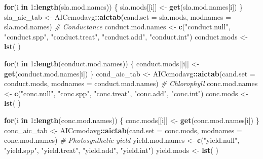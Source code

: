 \documentclass[]{scrartcl}
\newenvironment{Shaded}{\begin{snugshade}}{\end{snugshade}}
\newcommand{\CommentTok}[1]{\textcolor[rgb]{0.56,0.35,0.01}{\textit{#1}}}
\newcommand{\ControlFlowTok}[1]{\textcolor[rgb]{0.13,0.29,0.53}{\textbf{#1}}}
\newcommand{\DataTypeTok}[1]{\textcolor[rgb]{0.13,0.29,0.53}{#1}}
\newcommand{\DecValTok}[1]{\textcolor[rgb]{0.00,0.00,0.81}{#1}}
\newcommand{\KeywordTok}[1]{\textcolor[rgb]{0.13,0.29,0.53}{\textbf{#1}}}
\newcommand{\NormalTok}[1]{#1}
\newcommand{\OperatorTok}[1]{\textcolor[rgb]{0.81,0.36,0.00}{\textbf{#1}}}
\newcommand{\StringTok}[1]{\textcolor[rgb]{0.31,0.60,0.02}{#1}}
\begin{document}
\begin{Shaded}
\begin{Highlighting}[]
{{{{{{{{{{{{   \ControlFlowTok{for}\NormalTok{(i }\ControlFlowTok{in} \DecValTok{1}\OperatorTok{:}\KeywordTok{length}\NormalTok{(sla.mod.names)) \{}
\NormalTok{    sla.mods[[i]] <-}\StringTok{ }\KeywordTok{get}\NormalTok{(sla.mod.names[i]) \}}
\NormalTok{  sla_aic_tab <-}\StringTok{ }\NormalTok{AICcmodavg}\OperatorTok{::}\KeywordTok{aictab}\NormalTok{(}\DataTypeTok{cand.set =}\NormalTok{ sla.mods, }
                                    \DataTypeTok{modnames =}\NormalTok{ sla.mod.names) }
  \CommentTok{# Conductance}
\NormalTok{    conduct.mod.names <-}\StringTok{ }\KeywordTok{c}\NormalTok{(}\StringTok{"conduct.null"}\NormalTok{, }\StringTok{"conduct.spp"}\NormalTok{, }
                           \StringTok{"conduct.treat"}\NormalTok{, }\StringTok{"conduct.add"}\NormalTok{, }
                           \StringTok{"conduct.int"}\NormalTok{)}
\NormalTok{    conduct.mods <-}\StringTok{ }\KeywordTok{lst}\NormalTok{( )}
    
     \ControlFlowTok{for}\NormalTok{(i }\ControlFlowTok{in} \DecValTok{1}\OperatorTok{:}\KeywordTok{length}\NormalTok{(conduct.mod.names)) \{}
\NormalTok{        conduct.mods[[i]] <-}\StringTok{ }\KeywordTok{get}\NormalTok{(conduct.mod.names[i]) \}}
\NormalTok{      cond_aic_tab <-}\StringTok{ }\NormalTok{AICcmodavg}\OperatorTok{::}\KeywordTok{aictab}\NormalTok{(}\DataTypeTok{cand.set =}\NormalTok{ conduct.mods, }
                                         \DataTypeTok{modnames =}\NormalTok{ conduct.mod.names)}
  \CommentTok{# Chlorophyll }
\NormalTok{    conc.mod.names <-}\StringTok{ }\KeywordTok{c}\NormalTok{(}\StringTok{"conc.null"}\NormalTok{, }\StringTok{"conc.spp"}\NormalTok{, }
                        \StringTok{"conc.treat"}\NormalTok{, }\StringTok{"conc.add"}\NormalTok{, }
                        \StringTok{"conc.int"}\NormalTok{)}
\NormalTok{    conc.mods <-}\StringTok{ }\KeywordTok{lst}\NormalTok{( )}
    
     \ControlFlowTok{for}\NormalTok{(i }\ControlFlowTok{in} \DecValTok{1}\OperatorTok{:}\KeywordTok{length}\NormalTok{(conc.mod.names)) \{}
\NormalTok{      conc.mods[[i]] <-}\StringTok{ }\KeywordTok{get}\NormalTok{(conc.mod.names[i]) \}}
\NormalTok{     conc_aic_tab <-}\StringTok{ }\NormalTok{AICcmodavg}\OperatorTok{::}\KeywordTok{aictab}\NormalTok{(}\DataTypeTok{cand.set =}\NormalTok{ conc.mods, }
                                        \DataTypeTok{modnames =}\NormalTok{ conc.mod.names)}
  \CommentTok{# Photosynthetic yield}
\NormalTok{    yield.mod.names <-}\StringTok{ }\KeywordTok{c}\NormalTok{(}\StringTok{"yield.null"}\NormalTok{, }\StringTok{"yield.spp"}\NormalTok{, }
                         \StringTok{"yield.treat"}\NormalTok{, }\StringTok{"yield.add"}\NormalTok{, }
                         \StringTok{"yield.int"}\NormalTok{)}
\NormalTok{    yield.mods <-}\StringTok{ }\KeywordTok{lst}\NormalTok{( )}
    
}}}}}}}}}}}}
\end{Highlighting}
\end{Shaded}
\end{document}
